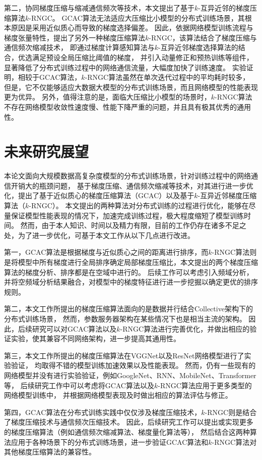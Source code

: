 \documentclass{xdupgthesis}
\begin{document}
第二，协同梯度压缩与缩减通信频次等技术，本文提出了基于$k$-互异近邻的梯度压缩算法$k$-RNGC。
GCAC算法无法适应大压缩比小模型的分布式训练场景，其根本原因是采用近似质心而导致的梯度选择偏差。
因此，依据网络模型训练流程与梯度张量特性，提出了另外一种梯度压缩算法$k$-RNGC，该算法结合了梯度压缩与通信频次缩减技术，
即通过梯度计算感知算法与$k$-互异近邻梯度选择算法的结合，优选满足预设全局压缩比阈值的梯度，
并引入动量修正和预热训练等组件，显著降低了分布式训练过程中的网络通信流量，大幅度加快了训练速度。
实验证明，相较于GCAC算法，$k$-RNGC算法虽然在单次迭代过程中的平均耗时较多，
但是，它不仅能够适应大数据大模型的分布式训练场景，而且网络模型的性能表现更为优异。
另外，值得注意的是，面临大压缩比小模型的场景时，$k$-RNGC算法不存在网络模型收敛性速度慢、性能下降严重的问题，并且具有极其优秀的通用性。


\section{未来研究展望}
本论文面向大规模数据高复杂度模型的分布式训练场景，针对训练过程中的网络通信开销大的瓶颈问题，
基于梯度压缩、通信频次缩减等技术，对其进行进一步优化，提出了基于近似质心的梯度压缩算法（GCAC）以及基于$k$-互异近邻梯度压缩算法（$k$-RNGC）。
本文提出的两种算法对分布式训练的过程进行优化，能够在尽量保证模型性能表现的情况下，加速完成训练过程，极大程度缩短了模型训练时间。
然而，由于本人知识、时间以及精力有限，目前的工作仍存在诸多不足之处，为了进一步优化，可基于本文工作从以下几点进行改进。

第一，GCAC算法是根据梯度与近似质心之间的距离进行排序，而$k$-RNGC算法则是将模型中所有梯度进行全局排序确定局部梯度压缩比，本文提出的两个梯度压缩算法的梯度分析、排序都是在空域中进行的。
后续工作可以考虑引入频域分析，
并将空频域分析结果融合，对模型中的梯度特征进行进一步挖掘以确定更优的排序规则。

第二，本文工作所提出的梯度压缩算法面向的是数据并行结合Collective架构下的分布式训练场景，
然而，参数服务器架构在某些情况下也是相当主流的架构。
因此，后续研究可以对GCAC算法以及$k$-RNGC算法进行完善优化，并做出相应的验证实验，使其兼容不同网络架构，进一步提高其通用性。

第三，本文工作所提出的梯度压缩算法在VGGNet以及ResNet网络模型进行了实验验证，
均取得不错的模型训练加速效果以及性能表现。
然而，仍有一些现有的网络模型并没有进行实验验证，例如GoogleNet、RNN、MobileNet、Transformer等，
后续研究工作中可以考虑将GCAC算法以及$k$-RNGC算法应用于更多类型的网络模型训练中，
并根据网络模型表现及时做出相应的算法评估与修正。

第四，GCAC算法在分布式训练实践中仅仅涉及梯度压缩技术，$k$-RNGC则是结合了梯度压缩技术与通信频次压缩技术。
因此，后续研究工作可以提出或实现更多的梯度压缩算法（例如通信频次缩减算法、梯度量化算法等），
然后结合这两种算法应用于各种场景下的分布式训练场景，进一步验证GCAC算法和$k$-RNGC算法对其他梯度压缩算法的兼容性。
\end{document}
